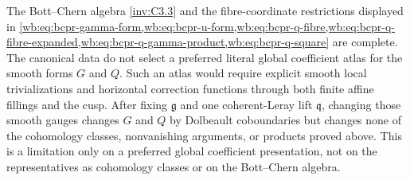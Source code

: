 \begin{remark}
\label{wb:rem:bcpr-global-gauge-boundary}
The Bott--Chern algebra \cref{inv:C3.3} and the fibre-coordinate
restrictions displayed in
\cref{wb:eq:bcpr-gamma-form,wb:eq:bcpr-u-form,wb:eq:bcpr-q-fibre,wb:eq:bcpr-q-fibre-expanded,wb:eq:bcpr-q-gamma-product,wb:eq:bcpr-q-square}
are complete.  The canonical data do not select a preferred literal global
coefficient atlas for the smooth forms $G$ and $Q$.  Such an atlas would
require explicit smooth local trivializations and horizontal correction
functions through both finite affine fillings and the cusp.  After fixing
$\mathfrak g$ and one coherent-Leray lift $\mathfrak q$, changing those
smooth gauges changes $G$ and $Q$ by Dolbeault coboundaries but changes
none of the cohomology classes, nonvanishing arguments, or products proved
above.  This is a limitation only on a preferred global coefficient
presentation, not on the representatives as cohomology classes or on the
Bott--Chern algebra.
\end{remark}



